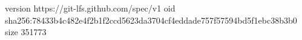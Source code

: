 version https://git-lfs.github.com/spec/v1
oid sha256:78433b4c482e4f2b1f2ccd5623da3704cf4eddade757f57594bd5f1ebc38b3b0
size 351773

